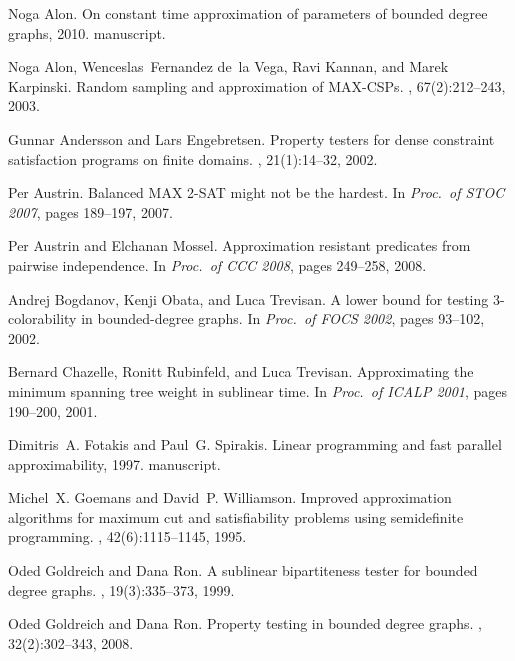 \documentclass[letterpaper, 11pt]{article}
\begin{document}
\newpage

\begin{thebibliography}{10}

Noga Alon.
\newblock On constant time approximation of parameters of bounded degree
  graphs, 2010.
\newblock manuscript.

Noga Alon, Wenceslas~Fernandez de~la Vega, Ravi Kannan, and Marek Karpinski.
\newblock Random sampling and approximation of {MAX}-{CSPs}.
, 67(2):212--243, 2003.

Gunnar Andersson and Lars Engebretsen.
\newblock Property testers for dense constraint satisfaction programs on finite
  domains.
, 21(1):14--32, 2002.

Per Austrin.
\newblock Balanced {MAX} 2-{SAT} might not be the hardest.
\newblock In {\em Proc.~of STOC 2007}, pages 189--197, 2007.

Per Austrin and Elchanan Mossel.
\newblock Approximation resistant predicates from pairwise independence.
\newblock In {\em Proc.~of CCC 2008}, pages 249--258, 2008.

Andrej Bogdanov, Kenji Obata, and Luca Trevisan.
\newblock A lower bound for testing 3-colorability in bounded-degree graphs.
\newblock In {\em Proc.~of FOCS 2002}, pages 93--102, 2002.

Bernard Chazelle, Ronitt Rubinfeld, and Luca Trevisan.
\newblock Approximating the minimum spanning tree weight in sublinear time.
\newblock In {\em Proc.~of ICALP 2001}, pages 190--200, 2001.

Dimitris~A. Fotakis and Paul~G. Spirakis.
\newblock Linear programming and fast parallel approximability, 1997.
\newblock manuscript.

Michel~X. Goemans and David~P. Williamson.
\newblock Improved approximation algorithms for maximum cut and satisfiability
  problems using semidefinite programming.
, 42(6):1115--1145, 1995.

Oded Goldreich and Dana Ron.
\newblock A sublinear bipartiteness tester for bounded degree graphs.
, 19(3):335--373, 1999.

Oded Goldreich and Dana Ron.
\newblock Property testing in bounded degree graphs.
, 32(2):302--343, 2008.


\end{thebibliography}
\end{document}
